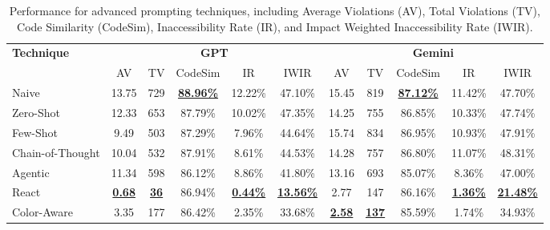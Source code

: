 \begin{table}[htbp]
  \centering
  \small
  \setlength{\tabcolsep}{2pt}
  \begin{tabular}{l
                ccccc            %
                @{\hspace{10pt}} %
                ccccc}
    \toprule
    \multirow{2}{*}{\textbf{Technique}} &
      \multicolumn{5}{c}{\textbf{GPT}} &
      \multicolumn{5}{c}{\textbf{Gemini}} \\
    \cmidrule(lr){2-6}\cmidrule(l){7-11}
      & AV & TV & CodeSim & IR & IWIR
      & AV & TV & CodeSim & IR & IWIR \\
    \midrule
    Naive               & 13.75 & 729 & \underline{\textbf{88.96\%}} & 12.22\% & 47.10\%
                        & 15.45 & 819 & \underline{\textbf{87.12\%}} & 11.42\% & 47.70\% \\
    Zero-Shot           & 12.33 & 653 & 87.79\% & 10.02\% & 47.35\%
                        & 14.25 & 755 & 86.85\% & 10.33\% & 47.74\% \\
    Few-Shot            &  9.49 & 503 & 87.29\% & 7.96\% & 44.64\%
                        & 15.74 & 834 & 86.95\% & 10.93\% & 47.91\% \\
    Chain-of-Thought    & 10.04 & 532 & 87.91\% & 8.61\% & 44.53\%
                        & 14.28 & 757 & 86.80\% & 11.07\% & 48.31\% \\
    Agentic             & 11.34 & 598 & 86.12\% & 8.86\% & 41.80\%
                        & 13.16 & 693 & 85.07\% & 8.36\% & 47.00\% \\
    React               & \underline{\textbf{0.68}} & \underline{\textbf{36}} & 86.94\% & \underline{\textbf{0.44\%}} & \underline{\textbf{13.56\%}}
                        & 2.77 & 147 & 86.16\% & \underline{\textbf{1.36\%}} & \underline{\textbf{21.48\%}} \\
    Color-Aware         & 3.35 & 177 & 86.42\% & 2.35\% & 33.68\%
                        & \underline{\textbf{2.58}} & \underline{\textbf{137}} & 85.59\% & 1.74\% & 34.93\% \\

    \bottomrule
  \end{tabular}
  \caption{Performance for advanced prompting techniques, including Average Violations (AV),
  Total Violations (TV), Code Similarity (CodeSim), Inaccessibility Rate (IR), and Impact Weighted Inaccessibility Rate (IWIR).}
  \label{tab:access-viol-models}
\end{table}
